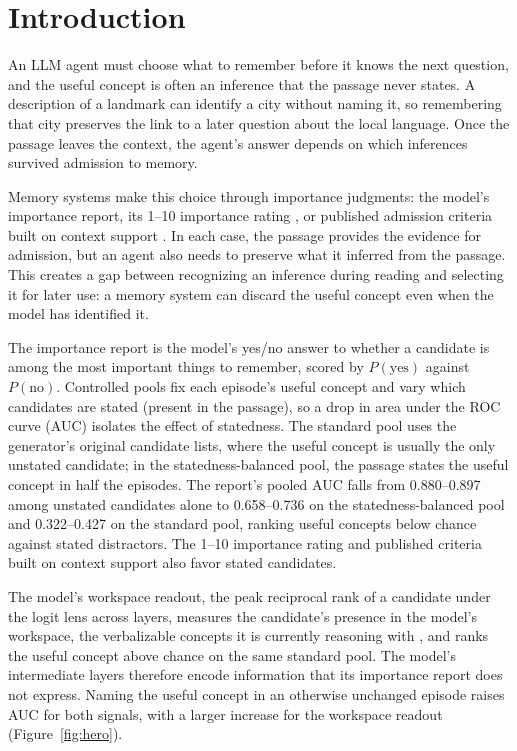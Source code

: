 \section{Introduction}
\label{sec:intro}

An LLM agent must choose what to remember before it knows the next
question, and the useful concept is often an inference that the passage
never states. A description of a landmark can identify a city without
naming it, so remembering that city preserves the link to a later
question about the local language. Once the passage leaves the context,
the agent's answer depends on which inferences survived admission to
memory.



Memory systems make this choice through importance judgments: the
model's importance report, its 1--10 importance rating
\citep{park2023generative}, or published admission criteria built on
context support \citep{amac2026,consistencygate2026}. In each case, the
passage provides the evidence for admission, but an agent also needs
to preserve what it inferred from the passage. This creates a gap
between recognizing an inference during reading and selecting it for
later use: a memory system can discard the useful concept even when
the model has identified it.

The importance report is the model's yes/no answer to whether a
candidate is among the most important things to remember, scored by
$P(\mathrm{yes})$ against $P(\mathrm{no})$. Controlled pools fix each
episode's useful concept and vary which candidates are stated
(present in the passage), so a drop in area under the ROC curve (AUC)
isolates the effect of statedness. The standard pool uses the
generator's original candidate lists, where the useful concept is
usually the only unstated candidate; in the statedness-balanced pool,
the passage states the useful concept in half the episodes. The
report's pooled AUC falls from 0.880--0.897 among unstated candidates
alone to 0.658--0.736 on the statedness-balanced pool and 0.322--0.427
on the standard pool, ranking useful concepts below chance against
stated distractors. The 1--10 importance rating and published criteria
built on context support also favor stated candidates.

The model's workspace readout, the peak reciprocal rank of a candidate
under the logit lens across layers, measures the candidate's presence
in the model's workspace, the verbalizable concepts it is currently
reasoning with \citep{anthropic2026workspace}, and ranks the useful
concept above chance on the same standard pool. The model's
intermediate layers therefore encode information that its importance
report does not express. Naming the useful concept in an otherwise
unchanged episode raises AUC for both signals, with a larger increase
for the workspace readout (Figure~\ref{fig:hero}).

